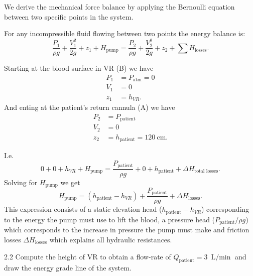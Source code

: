   \begin{derivation}
    We derive the mechanical force balance by applying the Bernoulli equation between two specific points in the system.

    For any incompressible fluid flowing between two points the energy balance is:
    \begin{equation*}
      \frac{P_1}{\rho g} + \frac{V_1^2}{2g} + z_1 + H_{\text{pump}} = \frac{P_2}{\rho g} + \frac{V_2^2}{2g} + z_2 + \sum H_{\text{losses}}
    .\end{equation*}
    
    Starting at the blood surface in VR (B) we have
    \begin{align*}
      P_1 &= P_{\mathrm{atm}} = 0 \\
      V_1 &= 0 \\
      z_1 &= h_{VR}
    .\end{align*}
    And enting at the patient's return cannula (A) we have
    \begin{align*}
      P_2 &= P_{\text{patient}} \\
      V_2 &= 0 \\
      z_2 &= h_{\text{patient}} = \qty{120}{\cm} 
    .\end{align*}

    I.e.
    \begin{equation*}
      0 + 0 + h_{VR} + H_{\text{pump}} = \frac{P_{\text{patient}}}{\rho g} + 0 + h_{\text{patient}} + \Delta H_{\text{total losses}}
    .\end{equation*}
    Solving for $H_{\text{pump}}$ we get
    \begin{equation*}
      H_{\text{pump}} = \left( h_{\text{patient}}  - h_{VR} \right) + \frac{P_{\text{patient}}}{\rho g} + \Delta H_{\text{losses}}
    .\end{equation*}
    This expression consists of a static elevation head ($h_{\text{patient}} - h_{VR}$) corresponding to the energy the pump must use to lift the blood, a pressure head ($P_{\text{patient}} / \rho g$) which corresponds to the increase in pressure the pump must make and friction losses $\Delta H_{\text{losses}}$ which explains all hydraulic resistances. 
  \end{derivation}


  \begin{problem}{2.2}
    Compute the height of VR to obtain a flow-rate of $Q_{\text{patient}} = \qty{3}{\L\per\min} $ and draw the energy grade line of the system.
  \end{problem}

